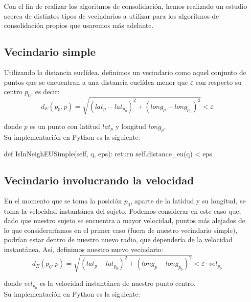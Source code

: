 \documentclass[a4paper, 12pt]{article}
\begin{document}
Con el fin de realizar los algoritmos de consolidaci\'on, hemos realizado un estudio acerca de distintos tipos de vecindarios a utilizar para los algoritmos de consolidaci\'on propios que usaremos m\'as adelante.\\

\subsection{Vecindario simple}

Utilizando la distancia eucl\'idea, definimos un vecindario como aquel conjunto de puntos que se  encuentran a una distancia eucl\'idea menor que $\varepsilon$ con respecto su centro $p_0$, es decir:\\

$$ d_E(p_0, p) = \sqrt{(lat_{p} - lat_{p_0})^2 + (long_{p} - long_{p_0})^2 } < \varepsilon $$

donde $p$ es un punto con latitud $lat_{p}$ y longitud $long_{p}$.\\

Su implementaci\'on en Python es la siguiente:\\

\begin{python}
        def IsInNeighEUSimple(self, q, eps):
                return self.distance_eu(q) < eps
\end{python}


\subsection{Vecindario involucrando la velocidad}

En el momento que se toma la posici\'on $p_0$, aparte de la latidud y su longitud, se toma la velocidad instant\'anea del sujeto. Podemos considerar en este caso que, dado que nuestro sujeto se  encuentra a mayor velocidad, puntos m\'as alejados de lo que considerar\'iamos en el primer caso (fuera de nuestro vecindario simple), podr\'ian estar dentro de nuestro nuevo radio, que depender\'ia de la velocidad instant\'anea. As\'i, definimos nuestro nuevo vecindario:\\

$$ d_E(p_0, p) = \sqrt{(lat_{p} - lat_{p_0})^2 + (long_{p} - long_{p_0})^2 } < \varepsilon \cdot vel_{p_0} $$

donde $vel_{p_0}$ es la velocidad instant\'anea de nuestro punto centro.\\


Su implementaci\'on en Python es la siguiente:\\
\end{document}
